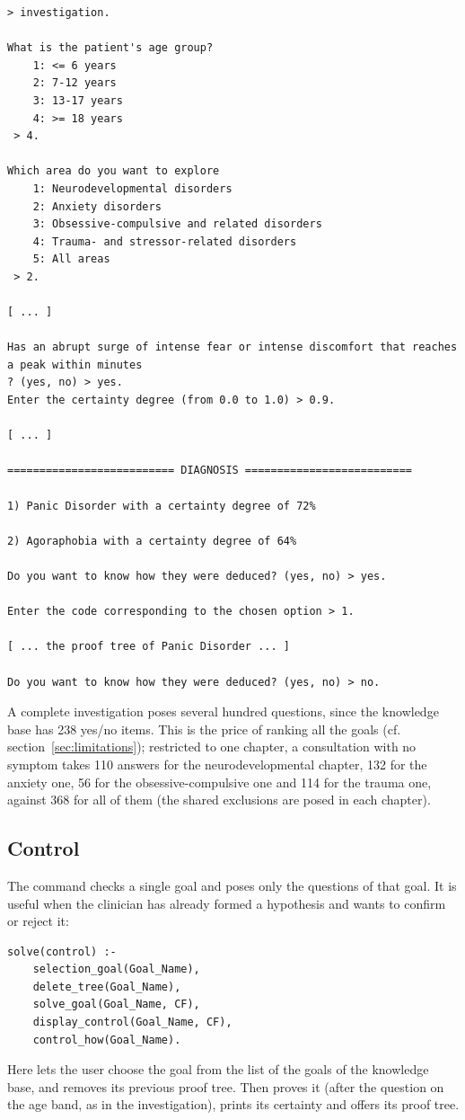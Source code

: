 \begin{lstlisting}
> investigation.

What is the patient's age group?
	1: <= 6 years
	2: 7-12 years
	3: 13-17 years
	4: >= 18 years
 > 4.

Which area do you want to explore
	1: Neurodevelopmental disorders
	2: Anxiety disorders
	3: Obsessive-compulsive and related disorders
	4: Trauma- and stressor-related disorders
	5: All areas
 > 2.

[ ... ]

Has an abrupt surge of intense fear or intense discomfort that reaches
a peak within minutes
? (yes, no) > yes.
Enter the certainty degree (from 0.0 to 1.0) > 0.9.

[ ... ]

========================== DIAGNOSIS ==========================

1) Panic Disorder with a certainty degree of 72%

2) Agoraphobia with a certainty degree of 64%

Do you want to know how they were deduced? (yes, no) > yes.

Enter the code corresponding to the chosen option > 1.

[ ... the proof tree of Panic Disorder ... ]

Do you want to know how they were deduced? (yes, no) > no.
\end{lstlisting}
A complete investigation poses several hundred questions, since the knowledge
base has 238 yes/no items. This is the price of ranking all the goals (cf.
section~\ref{sec:limitations}); restricted to one chapter, a consultation with
no symptom takes 110 answers for the neurodevelopmental chapter, 132 for the
anxiety one, 56 for the obsessive-compulsive one and 114 for the trauma one,
against 368 for all of them (the shared exclusions are posed in each chapter).

\subsection{Control}

The command  checks a single goal and poses only the questions of
that goal. It is useful when the clinician has already formed a hypothesis and
wants to confirm or reject it:
\begin{lstlisting}
solve(control) :-
    selection_goal(Goal_Name),
    delete_tree(Goal_Name),
    solve_goal(Goal_Name, CF),
    display_control(Goal_Name, CF),
    control_how(Goal_Name).
\end{lstlisting}
Here  lets the user choose the goal from the list of the
goals of the knowledge base, and  removes its previous
proof tree. Then  proves it (after the question on the age
band, as in the investigation),  prints its certainty
and  offers its proof tree.

